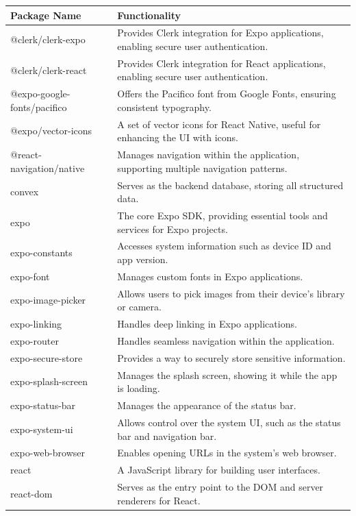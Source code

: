 \begin{longtable}{|p{4cm}|p{10cm}|}
\hline
\textbf{Package Name} & \textbf{Functionality} \\
\hline
@clerk/clerk-expo & Provides Clerk integration for Expo applications, enabling secure user authentication. \\
\hline
@clerk/clerk-react & Provides Clerk integration for React applications, enabling secure user authentication. \\
\hline
@expo-google-fonts/pacifico & Offers the Pacifico font from Google Fonts, ensuring consistent typography. \\
\hline
@expo/vector-icons & A set of vector icons for React Native, useful for enhancing the UI with icons. \\
\hline
@react-navigation/native & Manages navigation within the application, supporting multiple navigation patterns. \\
\hline
convex & Serves as the backend database, storing all structured data. \\
\hline
expo & The core Expo SDK, providing essential tools and services for Expo projects. \\
\hline
expo-constants & Accesses system information such as device ID and app version. \\
\hline
expo-font & Manages custom fonts in Expo applications. \\
\hline
expo-image-picker & Allows users to pick images from their device's library or camera. \\
\hline
expo-linking & Handles deep linking in Expo applications. \\
\hline
expo-router & Handles seamless navigation within the application. \\
\hline
expo-secure-store & Provides a way to securely store sensitive information. \\
\hline
expo-splash-screen & Manages the splash screen, showing it while the app is loading. \\
\hline
expo-status-bar & Manages the appearance of the status bar. \\
\hline
expo-system-ui & Allows control over the system UI, such as the status bar and navigation bar. \\
\hline
expo-web-browser & Enables opening URLs in the system's web browser. \\
\hline
react & A JavaScript library for building user interfaces. \\
\hline
react-dom & Serves as the entry point to the DOM and server renderers for React. \\

\end{longtable}
